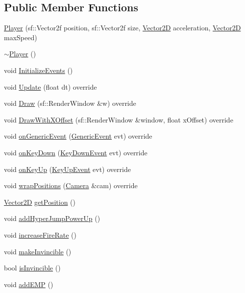 \subsection*{Public Member Functions}
\begin{DoxyCompactItemize}
\item 
\hyperlink{class_player_a92008587897cd5b46c85e7d4df5f3b79}{Player} (sf\+::\+Vector2f position, sf\+::\+Vector2f size, \hyperlink{class_vector2_d}{Vector2D} acceleration, \hyperlink{class_vector2_d}{Vector2D} max\+Speed)
\item 
\hyperlink{class_player_a749d2c00e1fe0f5c2746f7505a58c062}{$\sim$\+Player} ()
\item 
void \hyperlink{class_player_a5685ccedbb647c6dc475581af3454851}{Initialize\+Events} ()
\item 
void \hyperlink{class_player_a458939904cb2b2552089b841a5da5057}{Update} (float dt) override
\item 
void \hyperlink{class_player_acc9dd8e10a4e219e7ac78a822a7cde7b}{Draw} (sf\+::\+Render\+Window \&w) override
\item 
void \hyperlink{class_player_ad977242aa8bda63737df338b5095a931}{Draw\+With\+X\+Offset} (sf\+::\+Render\+Window \&window, float x\+Offset) override
\item 
void \hyperlink{class_player_a450eb63d50f2127f4417f50fa926ca30}{on\+Generic\+Event} (\hyperlink{class_event_listener_a23add62d02511a54eba0bae8208f9f48}{Generic\+Event} evt) override
\item 
void \hyperlink{class_player_a49ffb438bc970b3d72be35752eac1ce5}{on\+Key\+Down} (\hyperlink{class_event_listener_ae72c5cb67f8dc880170bf2137837f6ce}{Key\+Down\+Event} evt) override
\item 
void \hyperlink{class_player_a6f3fd001b6096fa6eb771c959687b33c}{on\+Key\+Up} (\hyperlink{class_event_listener_a69daf2aeedcab55e1f2c1c178206789e}{Key\+Up\+Event} evt) override
\item 
void \hyperlink{class_player_a09c333f62472d3ca96ef147126b518cd}{wrap\+Positions} (\hyperlink{class_camera}{Camera} \&cam) override
\item 
\hyperlink{class_vector2_d}{Vector2D} \hyperlink{class_player_a265be4030f017fed6b48136c1236d132}{get\+Position} ()
\item 
void \hyperlink{class_player_a7a77f784afbc411fd25c7630ac5c500b}{add\+Hyper\+Jump\+Power\+Up} ()
\item 
void \hyperlink{class_player_a919823b81b304a95d9052124648e7f49}{increase\+Fire\+Rate} ()
\item 
void \hyperlink{class_player_ae94b4c382ac84356018e9f11b13340af}{make\+Invincible} ()
\item 
bool \hyperlink{class_player_adba050abb9918cad32f1322b567875cf}{is\+Invincible} ()
\item 
void \hyperlink{class_player_a0dfaa62ad3dddedec5fbaaa7c637c655}{add\+E\+MP} ()
\end{DoxyCompactItemize}
